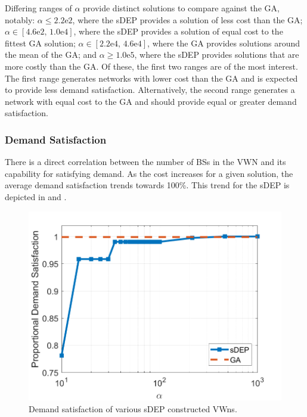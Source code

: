 \documentclass[12pt,dvipsnames]{report}
\newcommand{\expnumber}[2]{{#1}\mathrm{e}{#2}}
\begin{document}
Differing ranges of $\alpha$ provide distinct solutions to compare against the GA, notably: $\alpha \leq \expnumber{2.2}{2}$, where the sDEP provides a solution of less cost than the GA; $\alpha \in \left[ \expnumber{4.6}{2},\, \expnumber{1.0}{4} \right]$, where the sDEP provides a solution of equal cost to the fittest GA solution; $\alpha \in \left[ \expnumber{2.2}{4},\, \expnumber{4.6}{4} \right]$, where the GA provides solutions around the mean of the GA; and $\alpha \geq \expnumber{1.0}{5}$, where the sDEP provides solutions that are more costly than the GA.  Of these, the first two ranges are of the most interest.  The first range generates networks with lower cost than the GA and is expected to provide less demand satisfaction.  Alternatively, the second range generates a network with equal cost to the GA and should provide equal or greater demand satisfaction.

\subsubsection{Demand Satisfaction}

There is a direct correlation between the number of BSs in the VWN and its capability for satisfying demand.  As the cost increases for a given solution, the average demand satisfaction trends towards 100\%.  This trend for the sDEP is depicted in  and .

\begin{figure}[tp]
	\centering
	\includegraphics[height=0.4\textheight]{Figures/Prelim_O25_VOSDemandSatisfaction}
	\caption[Preliminary simulation sDEP demand satisfaction]{Demand satisfaction of various sDEP constructed VWns.}
	\label{fig:Prelim_VOSDemandSatisfaction}
\end{figure}
\end{document}
